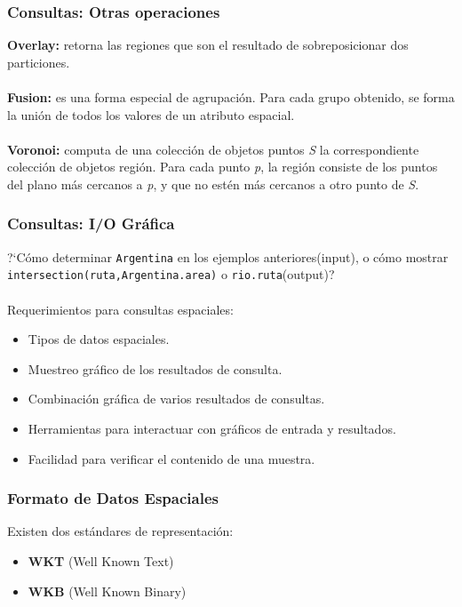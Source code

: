 \documentclass[12pt]{beamer}
\begin{document}
\begin{frame}
\frametitle{Consultas: Otras operaciones}

\textbf{Overlay:} retorna las regiones que son el resultado de sobreposicionar dos particiones.\\
\ \\
\textbf{Fusion:} es una forma especial de agrupaci\'on. Para cada grupo obtenido, se forma la uni\'on de todos los valores de un atributo espacial.\\
\ \\
\textbf{Voronoi:} computa de una colecci\'on de objetos puntos \textit{S} la correspondiente colecci\'on de objetos regi\'on. Para cada punto \textit{p}, la regi\'on consiste de los puntos del plano m\'as cercanos a \textit{p}, y que no est\'en m\'as cercanos a otro punto de \textit{S}.  
\end{frame}


\begin{frame}
\frametitle{Consultas: I/O Gr\'afica}
?`C\'omo determinar \texttt{Argentina} en los ejemplos anteriores(input), o c\'omo mostrar \texttt{intersection(ruta,Argentina.area)} o \texttt{rio.ruta}(output)?\\
\ \\
Requerimientos para consultas espaciales:
\begin{itemize}
\item Tipos de datos espaciales.
\item Muestreo gr\'afico de los resultados de consulta.
\item Combinaci\'on gr\'afica de varios resultados de consultas.
\item Herramientas para interactuar con gr\'aficos de entrada y resultados.
\item Facilidad para verificar el contenido de una muestra.
\end{itemize}
\end{frame}


\begin{frame}
\frametitle{Formato de Datos Espaciales}
Existen dos est\'andares de representaci\'on:
\ \\
\begin{itemize}
\item \textbf{WKT} (Well Known Text)
\item \textbf{WKB} (Well Known Binary)
\end{itemize}
\end{frame}
\end{document}

